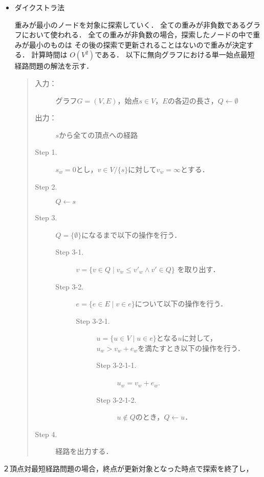 \documentclass[12pt]{optlab-bachelor}
\begin{document}
\begin{itemize}
  \item ダイクストラ法

  重みが最小のノードを対象に探索していく．
  全ての重みが非負数であるグラフにおいて使われる．
  全ての重みが非負数の場合，探索したノードの中で重みが最小のものは
  その後の探索で更新されることはないので重みが決定する．
  計算時間は $O(V^2)$である．
  以下に無向グラフにおける単一始点最短経路問題の解法を示す．

  \begin{quote}
    \begin{description}
      \item[入力：] グラフ$G=(V,E)$，始点$s \in V$，$E$の各辺の長さ，$Q \leftarrow \emptyset$
      \item[出力：] $s$から全ての頂点への経路
      \item[Step 1.] $s_w = 0$とし，$v \in V/\{s\}$に対して$v_w = \infty$とする．
      \item[Step 2.] $Q \leftarrow s$
      \item[Step 3.] $Q = \{\emptyset\}$になるまで以下の操作を行う．
      \begin{description}
        \item[Step 3-1.] $v = \{ v \in Q \mid v_w \leq v'_w \land v' \in Q \}$
        を取り出す．
        \item[Step 3-2.] $e = \{ e \in E \mid v \in e \}$について以下の操作を行う．

        \begin{description}
          \item[Step 3-2-1.] $u = \{ u \in V \mid u \in e\}$となる$u$に対して，
          $u_w > v_w + e_w$を満たすとき以下の操作を行う．

          \begin{description}
            \item[Step 3-2-1-1.] $u_w = v_w + e_w$.
            \item[Step 3-2-1-2.] $u \notin Q$のとき，$Q \leftarrow u$．
          \end{description}
        \end{description}
      \end{description}

      \item[Step 4.] 経路を出力する．
    \end{description}
  \end{quote}
\end{itemize}
２頂点対最短経路問題の場合，終点が更新対象となった時点で探索を終了し，
\end{document}
